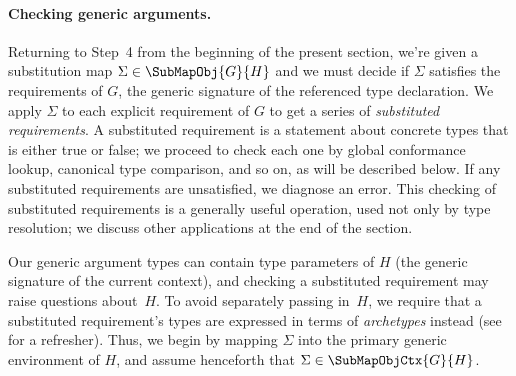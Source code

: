 \documentclass[../generics]{subfiles}
\begin{document}
\paragraph{Checking generic arguments.}
Returning to Step~4 from the beginning of the present section, we're given a substitution map $\Sigma\in\SubMapObj{G}{H}$ and we must decide if $\Sigma$ satisfies the requirements of $G$, the generic signature of the referenced type declaration. We apply $\Sigma$ to each explicit requirement of $G$ to get a series of \emph{substituted requirements}. A substituted requirement is a statement about concrete types that is either true or false; we proceed to check each one by global conformance lookup, canonical type comparison, and so on, as will be described below. If any substituted requirements are unsatisfied, we diagnose an error. This checking of substituted requirements is a generally useful operation, used not only by type resolution; we discuss other applications at the end of the section.

Our generic argument types can contain type parameters of $H$ (the generic signature of the current context), and checking a substituted requirement may raise questions about~$H$. To avoid separately passing in~$H$, we require that a substituted requirement's types are expressed in terms of \emph{archetypes} instead (see  for a refresher). Thus, we begin by mapping $\Sigma$ into the primary generic environment of $H$, and assume henceforth that $\Sigma\in\SubMapObjCtx{G}{H}$.
\end{document}
